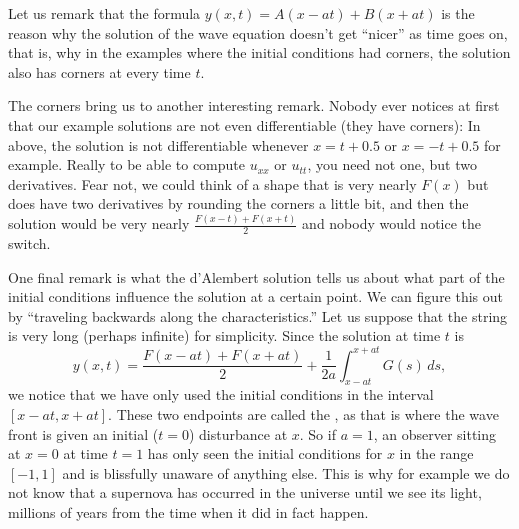 \documentclass{ximera}
\begin{document}
Let us remark that the formula $y(x,t) = A(x-at) + B(x+at)$ is the reason why the solution of the wave equation doesn't get ``nicer'' as time goes on, that is, why in the examples where the initial conditions had corners, the solution also has corners at every time $t$.

The corners bring us to another interesting remark.  Nobody ever notices at first that our example solutions are not even differentiable (they have corners): In  above, the solution is not differentiable whenever $x=t+0.5$ or $x=-t+0.5$ for example. Really to be able to compute $u_{xx}$ or $u_{tt}$, you need not one, but two derivatives.  Fear not, we could think of a shape that is very nearly $F(x)$ but does have two derivatives by rounding the corners a little bit, and then the solution would be very nearly $\frac{F(x-t)+F(x+t)}{2}$ and nobody would notice the switch.


One final remark is what the d'Alembert solution tells us about what part of the initial conditions influence the solution at a certain point. We can figure this out by ``traveling backwards along the characteristics.''  Let us suppose that the string is very long (perhaps infinite) for simplicity.  Since the solution at time $t$ is
\begin{equation*}
    y(x,t) = \frac{F(x-at) + F(x+at)}{2} + \frac{1}{2a} \int_{x-at}^{x+at} G(s) \,ds ,
\end{equation*}
we notice that we have only used the initial conditions in the interval $[x-at,x+at]$.  These two endpoints are called the \emph{}, as that is where the wave front is given an initial ($t=0$) disturbance at $x$. So if $a=1$, an observer sitting at $x=0$ at time $t=1$ has only seen the initial conditions for $x$ in the range $[-1,1]$ and is blissfully unaware of anything else. This is why for example we do not know that a supernova has occurred in the universe until we see its light, millions of years from the time when it did in fact happen.
\end{document}
